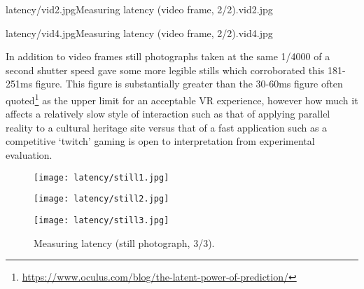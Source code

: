        {latency/vid2.jpg}{Measuring latency (video frame, 2/2).}{vid2.jpg}

       {latency/vid4.jpg}{Measuring latency (video frame, 2/2).}{vid4.jpg}

\newpage

In addition to video frames still photographs taken at the same 1/4000 of a second shutter speed gave some more legible stills which corroborated this 181-251ms figure. This figure is substantially greater than the 30-60ms figure often quoted\footnote{\url{https://www.oculus.com/blog/the-latent-power-of-prediction/}} as the upper limit for an acceptable VR experience, however how much it affects a relatively slow style of interaction such as that of applying parallel reality to a cultural heritage site versus that of a fast application such as a competitive `twitch' gaming is open to interpretation from experimental evaluation.

\begin{figure}[h]
    \begin{center}
    \begin{minipage}{.32\textwidth}
        \begin{center}
        \texttt{[image: latency/still1.jpg]}
        \caption{Measuring latency (still photograph, 1/3).}
        \label{still1.jpg}
        \end{center}
    \end{minipage}%
    \hspace{.01\textwidth}
    \begin{minipage}{.32\textwidth}
		\begin{center}
        \texttt{[image: latency/still2.jpg]}
        \caption{Measuring latency (still photograph, 2/3).}
        \label{still2.jpg}
        \end{center}
    \end{minipage}%
    \hspace{.01\textwidth}
    \begin{minipage}{.32\textwidth}
        \begin{center}
        \texttt{[image: latency/still3.jpg]}
        \caption{Measuring latency (still photograph, 3/3).}
        \label{still3.jpg}
        \end{center}
    \end{minipage}
    \end{center}
\end{figure}

